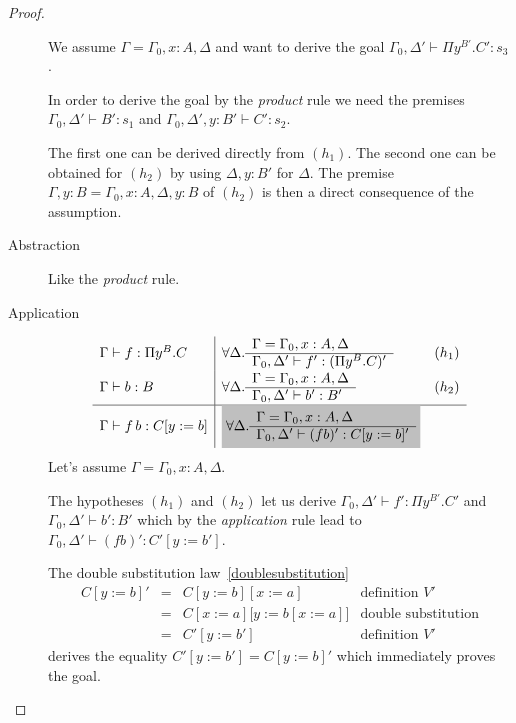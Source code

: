 \documentclass[12pt]{article}
\begin{document}
\begin{theorem}
\begin{proof}
\begin{description}
      We assume $\Gamma = \Gamma_0,x:A,\Delta$ and want to derive the goal
      $\Gamma_0,\Delta' \vdash \Pi y^{B'}. C' : s_3$.

      In order to derive the goal by the \emph{product} rule we need the
      premises $\Gamma_0,\Delta' \vdash B': s_1$ and
      $\Gamma_0,\Delta',y:B' \vdash C': s_2$.

      The first one can be derived directly from $(h_1)$. The second one can
      be obtained for $(h_2)$ by using $\Delta,y:B'$ for $\Delta$. The premise
      $\Gamma,y:B = \Gamma_0,x:A,\Delta,y:B$ of $(h_2)$ is then a direct
      consequence of the assumption.

    \item[Abstraction] Like the \emph{product} rule.

    \item[Application]
      $$
      \begin{array}{l|ll}
        \Gamma\vdash f: \Pi y^B.C
        &\forall \Delta .
          \rulev
          {\Gamma = \Gamma_0,x:A,\Delta}
          {\Gamma_0,\Delta' \vdash f': (\Pi y^B.C)'} & (h_1)
        \\
        \Gamma \vdash b: B
        &\forall \Delta .
          \rulev
          {\Gamma = \Gamma_0,x:A,\Delta}
          {\Gamma_0,\Delta' \vdash b': B'} & (h_2)
        \\
        \hline %
        \Gamma \vdash f\, b : C[y:=b]
        & \goalbg{
          \forall \Delta .
          \rulev
          {\Gamma = \Gamma_0,x:A,\Delta}
          {\Gamma_0,\Delta' \vdash (f b)': C[y:=b]'}
          }
      \end{array}
      $$
      Let's assume $\Gamma = \Gamma_0,x:A,\Delta$.

      The hypotheses $(h_1)$ and $(h_2)$ let us derive
      $\Gamma_0,\Delta' \vdash f': \Pi y^{B'}.C'$ and
      $\Gamma_0,\Delta' \vdash b': B'$
      which by the \emph{application} rule lead to
      $\Gamma_0,\Delta' \vdash (f b)' : C'[y:=b']$.

      The double substitution law~\ref{doublesubstitution}
      $$
      \begin{array}{llll}
        C[y:=b]'
        & = & C[y:=b][x:=a]       & \text{definition } V'\\
        & = & C[x:=a]\big[y:=b[x:=a]\big] & \text{double substitution} \\
        & = & C'[y:=b']           & \text{definition } V'
      \end{array}
      $$
      derives the equality $C'[y:=b'] = C[y:=b]'$ which immediately proves the
      goal.


\end{description}
\end{proof}
\end{theorem}
\end{document}
